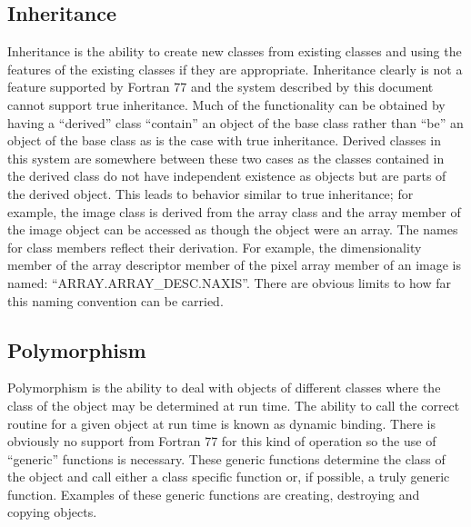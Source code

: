 \subsection{Inheritance}
   Inheritance is the ability to create new classes from existing
classes and using the features of the existing classes if they are
appropriate.  Inheritance clearly is not a feature supported by
Fortran 77 and the system described by this document cannot support
true inheritance.  Much of the functionality can be obtained by having
a ``derived'' class ``contain'' an object of the base class rather
than ``be'' an object of the base class as is the case with true
inheritance.  Derived classes in this system are somewhere between
these two cases as the classes contained in the derived class do not
have independent existence as objects but are parts of the derived
object.  This leads to behavior similar to true inheritance; for
example, the image class is derived from the array class and the array
member of the image object can be accessed as though the object were
an array. The names for class members reflect their derivation.  For
example, the dimensionality member of the array descriptor member of
the pixel array member of an image is named:
``ARRAY.ARRAY\_DESC.NAXIS''.  There are obvious limits to how far this
naming convention can be carried.

\subsection{Polymorphism}
    Polymorphism is the ability to deal with objects of different
classes where the class of the object may be determined at run time.
The ability to call the correct routine for a given object at run time
is known as dynamic binding.  There is obviously no support from
Fortran 77 for this kind of operation so the use of ``generic''
functions is necessary.  These generic functions determine the class
of the object and call either a class specific function or, if
possible, a truly generic function.  Examples of these generic
functions are creating, destroying and copying objects.

